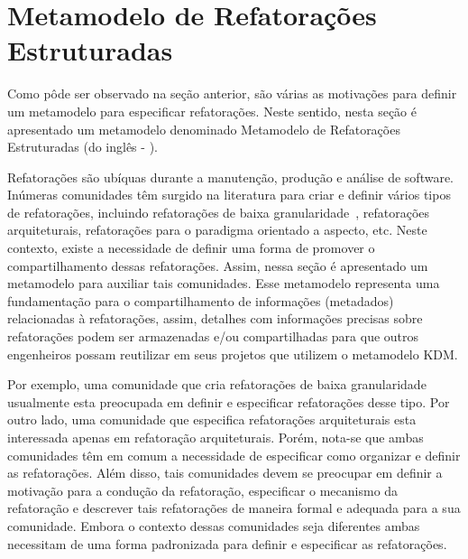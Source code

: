 
\section{Metamodelo de Refatorações Estruturadas} %
\label{sec:meta_modelo_de_refatora_es_estruturadas_srm_do_ingl_s_structured refactoring meta-model_}

Como pôde ser observado na seção anterior, são várias as motivações para definir um metamodelo para especificar refatorações. Neste sentido, nesta seção é apresentado um metamodelo denominado Metamodelo de Refatorações Estruturadas (do inglês - ).

Refatorações são ubíquas durante a manutenção, produção e análise de software. Inúmeras comunidades têm surgido na literatura para criar e definir vários tipos de refatorações, incluindo refatorações de baixa granularidade~\cite{Fowler1999, Demeyer1, Demeyer2}, refatorações arquiteturais, refatorações para o paradigma orientado a aspecto, etc. Neste contexto, existe a necessidade de definir uma forma de promover o compartilhamento dessas refatorações. Assim, nessa seção é apresentado um metamodelo para auxiliar tais comunidades. Esse metamodelo representa uma fundamentação para o compartilhamento de informações (metadados) relacionadas à refatorações, assim, detalhes com informações precisas sobre refatorações podem ser armazenadas e/ou compartilhadas para que outros engenheiros possam reutilizar em seus projetos que utilizem o metamodelo KDM.

Por exemplo, uma comunidade que cria refatorações de baixa granularidade usualmente esta preocupada em definir e especificar refatorações desse tipo. Por outro lado, uma comunidade que especifica refatorações arquiteturais esta interessada apenas em refatoração arquiteturais. Porém, nota-se que ambas comunidades têm em comum a necessidade de especificar como organizar e definir as refatorações. Além disso, tais comunidades devem se preocupar em definir a motivação para a condução da refatoração, especificar o mecanismo da refatoração e descrever tais refatorações de maneira formal e adequada para a sua comunidade. Embora o contexto dessas comunidades seja diferentes ambas necessitam de uma forma padronizada para definir e especificar as refatorações. 


